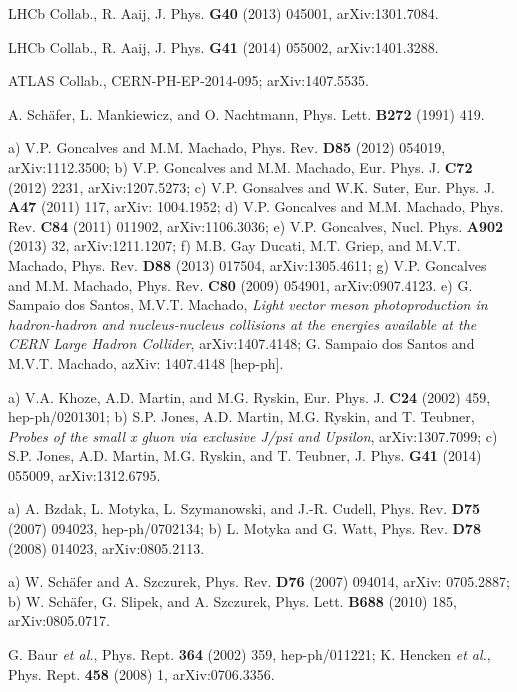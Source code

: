 \documentclass[12pt]{article}
\begin{document}
\begin{thebibliography}{99}
 LHCb Collab., R. Aaij, J. Phys. {\bf G40} (2013) 045001, arXiv:1301.7084.

  LHCb Collab., R. Aaij, J. Phys. {\bf G41} (2014) 055002, arXiv:1401.3288.

 ATLAS Collab., CERN-PH-EP-2014-095; arXiv:1407.5535.

 A. Sch\"afer, L. Mankiewicz, and O. Nachtmann, Phys. Lett. {\bf B272} (1991) 419.

 a) V.P. Goncalves and M.M. Machado, Phys. Rev. {\bf D85} (2012) 054019, arXiv:1112.3500;
b) V.P. Goncalves and M.M. Machado, Eur. Phys. J. {\bf C72} (2012) 2231, arXiv:1207.5273; c) V.P. Gonsalves and W.K. Suter, Eur. Phys. J. {\bf A47} (2011) 117,
arXiv: 1004.1952;
d) V.P. Goncalves and M.M. Machado, Phys. Rev. {\bf C84} (2011) 011902, arXiv:1106.3036; e) V.P. Goncalves, Nucl. Phys. {\bf A902} (2013) 32,  
arXiv:1211.1207; f) M.B. Gay Ducati, M.T. Griep, and M.V.T. Machado, Phys. Rev. {\bf D88} (2013) 017504, arXiv:1305.4611;
g) V.P. Goncalves and M.M. Machado, Phys. Rev. {\bf C80} (2009) 054901, arXiv:0907.4123.
e)  G. Sampaio dos Santos, M.V.T. Machado, {\it Light vector meson photoproduction in hadron-hadron and nucleus-nucleus collisions at the energies available at the CERN Large Hadron Collider}, arXiv:1407.4148; G. Sampaio dos Santos and M.V.T. Machado, azXiv: 1407.4148 [hep-ph].

 a) V.A. Khoze, A.D. Martin, and M.G. Ryskin, Eur. Phys. J. {\bf C24} (2002) 459, hep-ph/0201301;
b) S.P. Jones, A.D. Martin, M.G. Ryskin, and T. Teubner, {\it Probes of the small x gluon via exclusive J/psi and Upsilon}, arXiv:1307.7099;
c) S.P. Jones, A.D. Martin, M.G. Ryskin, and T. Teubner,  J. Phys. {\bf G41} (2014) 055009, arXiv:1312.6795.

 a) A. Bzdak,  L. Motyka, L. Szymanowski, and J.-R. Cudell, Phys. Rev. {\bf D75} (2007) 094023, hep-ph/0702134; 
b) L. Motyka and G. Watt, Phys. Rev. {\bf D78} (2008) 014023, arXiv:0805.2113.

 a) W. Sch\"afer and A. Szczurek, Phys. Rev. {\bf D76} (2007) 094014, arXiv: 0705.2887; b) W. Sch\"afer, G. Slipek, and A. Szczurek,
Phys. Lett. {\bf B688} (2010) 185, arXiv:0805.0717.


 G. Baur {\it et al.}, Phys. Rept. {\bf 364} (2002) 359, hep-ph/011221; K. Hencken {\it et al.}, Phys. Rept. {\bf 458} (2008) 1, arXiv:0706.3356.


\end{thebibliography}
\end{document}
